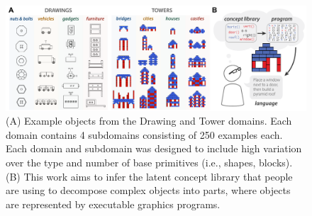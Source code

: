 \documentclass[10pt,letterpaper]{article}
\begin{document}



\begin{figure}[ht!]
  \begin{center}
  \includegraphics[width=0.99\linewidth]{figures/lax_task.pdf}
  \caption{(A) Example objects from the Drawing and Tower domains. Each domain contains 4 subdomains consisting of 250 examples each. Each domain and subdomain was designed to include high variation over the type and number of base primitives (i.e., shapes, blocks). (B) This work aims to infer the latent concept library that people are using to decompose complex objects into parts, where objects are represented by executable graphics programs.}
  \label{fig:task}
  \end{center}
 \end{figure}
\end{document}
